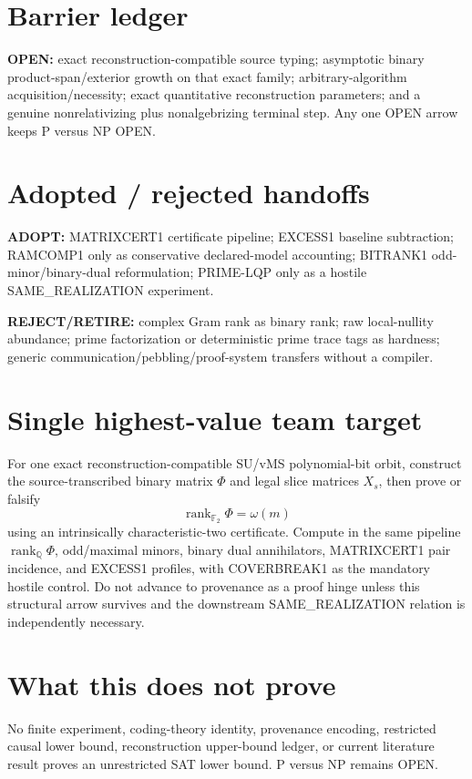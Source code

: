 \documentclass[11pt]{article}
\begin{document}
\section*{Barrier ledger}
\textbf{OPEN:} exact reconstruction-compatible source typing; asymptotic binary product-span/exterior growth on that exact family; arbitrary-algorithm acquisition/necessity; exact quantitative reconstruction parameters; and a genuine nonrelativizing plus nonalgebrizing terminal step. Any one OPEN arrow keeps P versus NP OPEN.

\section*{Adopted / rejected handoffs}
\textbf{ADOPT:} MATRIXCERT1 certificate pipeline; EXCESS1 baseline subtraction; RAMCOMP1 only as conservative declared-model accounting; BITRANK1 odd-minor/binary-dual reformulation; PRIME-LQP only as a hostile SAME_REALIZATION experiment.

\textbf{REJECT/RETIRE:} complex Gram rank as binary rank; raw local-nullity abundance; prime factorization or deterministic prime trace tags as hardness; generic communication/pebbling/proof-system transfers without a compiler.

\section*{Single highest-value team target}
For one exact reconstruction-compatible SU/vMS polynomial-bit orbit, construct the source-transcribed binary matrix \(\Phi\) and legal slice matrices \(X_s\), then prove or falsify
\[
\boxed{\operatorname{rank}_{\mathbb F_2}\Phi=\omega(m)}
\]
using an intrinsically characteristic-two certificate. Compute in the same pipeline \(\operatorname{rank}_{\mathbb Q}\Phi\), odd/maximal minors, binary dual annihilators, MATRIXCERT1 pair incidence, and EXCESS1 profiles, with COVERBREAK1 as the mandatory hostile control. Do not advance to provenance as a proof hinge unless this structural arrow survives and the downstream SAME_REALIZATION relation is independently necessary.

\section*{What this does not prove}
No finite experiment, coding-theory identity, provenance encoding, restricted causal lower bound, reconstruction upper-bound ledger, or current literature result proves an unrestricted SAT lower bound. P versus NP remains OPEN.
\end{document}
